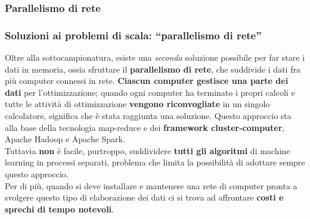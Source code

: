 \subsubsection[Parallelismo di rete]{Parallelismo di rete}
\begin{frame}
	
	\frametitle{Soluzioni ai problemi di scala: {\color{GradientDescentDiagramRed}``parallelismo di rete''}}
	
		Oltre alla sottocampionatura, esiste una \textit{seconda} soluzione possibile per far stare i dati in memoria, ossia sfruttare il \textbf{parallelismo di rete}, che suddivide i dati fra più computer connessi in rete.
		\textbf{Ciascun computer gestisce una parte dei dati} per l’ottimizzazione; quando ogni computer ha terminato i propri calcoli e tutte le attività di ottimizzazione \textbf{vengono riconvogliate} in un singolo calcolatore, significa che è stata raggiunta una soluzione.
		\newlinedouble
		Questo approccio sta alla base della tecnologia map-reduce e dei \textbf{framework cluster-computer}, Apache Hadoop e Apache Spark.\\
		Tuttavia \textbf{non} è facile, purtroppo, suddividere \textbf{tutti gli algoritmi} di machine learning in processi separati, problema che limita la possibilità di adottare sempre questo approccio.\\
		Per di più, quando si deve installare e mantenere una rete di computer pronta a svolgere questo tipo di elaborazione dei dati ci si trova ad affrontare \textbf{costi e sprechi di tempo notevoli}.

\end{frame}


